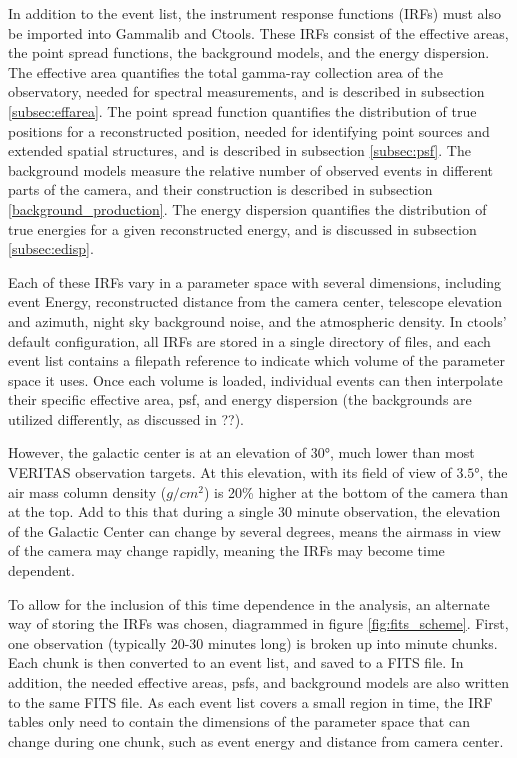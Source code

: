   In addition to the event list, the instrument response functions (IRFs) must also be imported into Gammalib and Ctools.
  These IRFs consist of the effective areas, the point spread functions, the background models, and the energy dispersion.
  The effective area quantifies the total gamma-ray collection area of the observatory, needed for spectral measurements, and is described in subsection \ref{subsec:effarea}.
  The point spread function quantifies the distribution of true positions for a reconstructed position, needed for identifying point sources and extended spatial structures, and is described in subsection \ref{subsec:psf}.
  The background models measure the relative number of observed events in different parts of the camera, and their construction is described in subsection \ref{background_production}.
  The energy dispersion quantifies the distribution of true energies for a given reconstructed energy, and is discussed in subsection \ref{subsec:edisp}.

  Each of these IRFs vary in a parameter space with several dimensions, including event Energy, reconstructed distance from the camera center, telescope elevation and azimuth, night sky background noise, and the atmospheric density.
  In ctools' default configuration, all IRFs are stored in a single directory of files, and each event list contains a filepath reference to indicate which volume of the parameter space it uses.
  Once each volume is loaded, individual events can then interpolate their specific effective area, psf, and energy dispersion (the backgrounds are utilized differently, as discussed in ??).

  However, the galactic center is at an elevation of $\ang{30}$, much lower than most VERITAS observation targets.
  At this elevation, with its field of view of $\ang{3.5}$, the air mass column density ($g/cm^{2}$) is 20\% higher at the bottom of the camera than at the top.
  Add to this that during a single 30 minute observation, the elevation of the Galactic Center can change by several degrees, means the airmass in view of the camera may change rapidly, meaning the IRFs may become time dependent.

  To allow for the inclusion of this time dependence in the analysis, an alternate way of storing the IRFs was chosen, diagrammed in figure \ref{fig:fits_scheme}.
  First, one observation (typically 20-30 minutes long) is broken up into  minute chunks.
  Each chunk is then converted to an event list, and saved to a FITS file.
  In addition, the needed effective areas, psfs, and background models are also written to the same FITS file.
  As each event list covers a small region in time, the IRF tables only need to contain the dimensions of the parameter space that can change during one chunk, such as event energy and distance from camera center.

